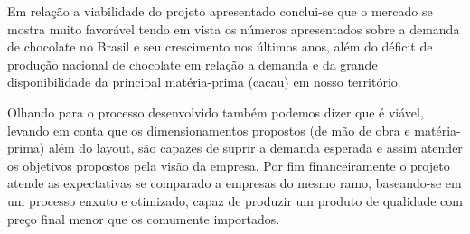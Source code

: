 \documentclass[
	12pt,				%
	openright,			%
	oneside,			%
	a4paper,			%
	english,			%
	french,				%
	spanish,			%
	brazil				%
	]{abntex2}
\begin{document}
Em relação a viabilidade do projeto apresentado conclui-se que o mercado se mostra muito favorável tendo em vista os números apresentados sobre a demanda de chocolate no Brasil e seu crescimento nos últimos anos, além do déficit de produção nacional de chocolate em relação a demanda e da grande disponibilidade da principal matéria-prima (cacau) em nosso território.

Olhando para o processo desenvolvido também podemos dizer que é viável, levando em conta que os dimensionamentos propostos (de mão de obra e matéria-prima) além do layout, são capazes de suprir a demanda esperada e assim atender os objetivos propostos pela visão da empresa. Por fim financeiramente o projeto atende as expectativas se comparado a empresas do mesmo ramo, baseando-se em um processo enxuto e otimizado, capaz de produzir um produto de qualidade com preço final menor que os comumente importados.

\newpage
\postextual






\end{document}
